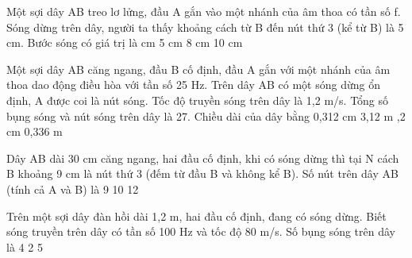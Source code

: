 \begin{ex}%
Một sợi dây AB treo lơ lửng, đầu A gắn vào một nhánh của âm thoa có tần số f. Sóng dừng trên dây, người ta thấy khoảng cách từ B đến nút thứ 3 (kể từ B) là 5 cm. Bước sóng có giá trị là
\choice
{ cm}
{5 cm}
{8 cm}
{10 cm}
\end{ex} 
\begin{ex}%
Một sợi dây AB căng ngang, đầu B cố định, đầu A gắn với một nhánh của âm thoa dao động điều hòa với tần số 25 Hz. Trên dây AB có một sóng dừng ổn định, A được coi là nút sóng. Tốc độ truyền sóng trên dây là 1,2 m/s. Tổng số bụng sóng và nút sóng trên dây là 27. Chiều dài của dây bằng
\choice
{0,312 cm}
{3,12 m}
{,2 cm}
{0,336 m}
\end{ex} 
\begin{ex}%
Dây AB dài 30 cm căng ngang, hai đầu cố định, khi có sóng dừng thì tại N cách B khoảng 9 cm là nút thứ 3 (đếm từ đầu B và không kể B). Số nút trên dây AB (tính cả A và B) là
\choice
{9}
{10}
{}
{12}
\end{ex} 
\begin{ex}%
Trên một sợi dây đàn hồi dài 1,2 m, hai đầu cố định, đang có sóng dừng. Biết sóng truyền trên dây có tần số 100 Hz và tốc độ 80 m/s. Số bụng sóng trên dây là
\choice
{}
{4}
{2}
{5}
\end{ex} 
